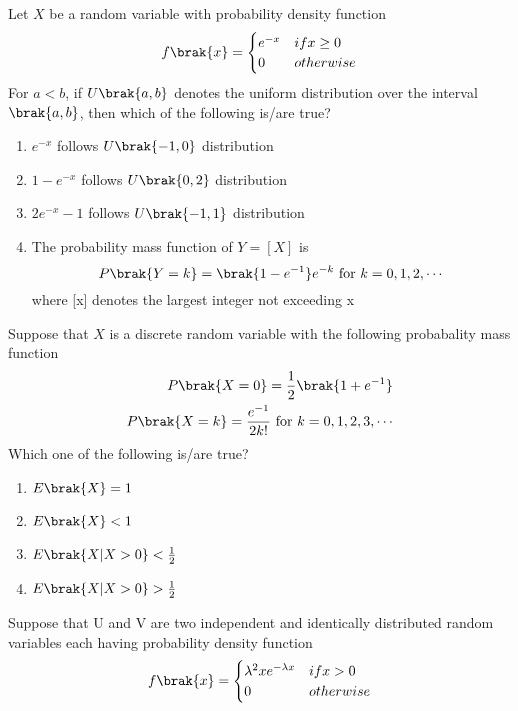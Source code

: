 \iffalse
\chapter{2023}
\author{AI24BTECH11011}
\section{st}
\fi

\item Let $X$ be a random variable with probability density function 
\[
f\brak{x}=
\begin{cases}
    e^{-x} & if x\geq 0\\
    0 & otherwise
\end{cases}
\]
For $a<b$, if $U\brak{a,b}$ denotes the uniform distribution over the interval $\brak{a,b}$, then which of the following is/are true?
\begin{enumerate}
    \item $e^{-x}$ follows $U\brak{-1,0}$ distribution
    \item $1-e^{-x}$ follows $U\brak{0,2}$ distribution
 \item $2e^{-x}-1$ follows $U\brak{-1,1}$ distribution
 \item The probability mass function of $Y=[X]$ is $$P\brak{Y=k}=\brak{1-e^{-1}}e^{-k} \text{ for } k=0,1,2,\cdots$$
 where [x] denotes the largest integer not exceeding x
\end{enumerate}
\item Suppose that $X$ is a discrete random variable with the following probabality mass function 
\begin{align}
    P\brak{X=0}=\frac{1}{2}\brak{1+e^{-1}}\\
    P\brak{X=k}=\frac{e^{-1}}{2k!} \text{ for } k=0,1,2,3,\cdots
\end{align}
Which one of the following is/are true?
\begin{enumerate}
    \item $E\brak{X}=1$
    \item $E\brak{X}<1$
    \item $E\brak{X|X>0}<\frac{1}{2}$
    \item $E\brak{X|X>0}>\frac{1}{2}$
\end{enumerate}
\item Suppose that U and V are two independent and identically distributed random variables each having probability density function
\[
f\brak{x}=
\begin{cases}
    \lambda^2xe^{-\lambda x} & if x>0\\
    0 & otherwise
\end{cases}
\]

